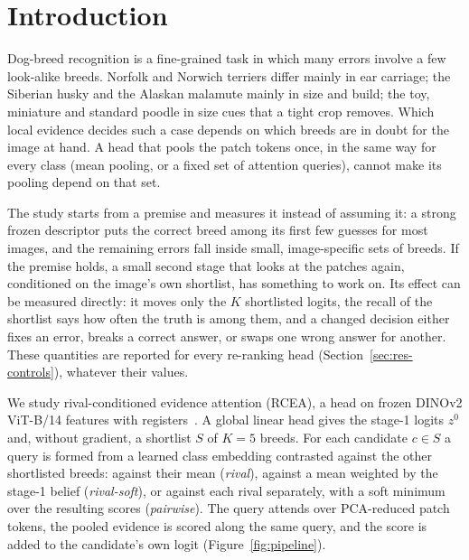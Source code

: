 \documentclass[11pt,a4paper]{article}
\theoremstyle{plain}
\begin{document}
\section{Introduction}\label{sec:intro}

Dog-breed recognition is a fine-grained task in which many errors involve a few look-alike breeds. Norfolk and
Norwich terriers differ mainly in ear carriage; the Siberian husky and the Alaskan malamute mainly in size and
build; the toy, miniature and standard poodle in size cues that a tight crop removes. Which local evidence decides such a
case depends on which breeds are in doubt for the image at hand. A head that pools the patch tokens once, in the
same way for every class (mean pooling, or a fixed set of attention queries), cannot make its pooling depend on
that set.

The study starts from a premise and measures it instead of assuming it: a strong frozen descriptor puts the correct
breed among its first few guesses for most images, and the remaining errors fall inside small, image-specific sets
of breeds. If the premise holds, a small second stage that looks at the patches again, conditioned on the image's
own shortlist, has something to work on. Its effect can be measured directly: it moves only the $K$ shortlisted
logits, the recall of the shortlist says how often the truth is among them, and a changed decision either fixes an
error, breaks a correct answer, or swaps one wrong answer for another. These quantities are reported for every
re-ranking head (Section~\ref{sec:res-controls}), whatever their values.

We study rival-conditioned evidence attention (RCEA), a head on frozen DINOv2 ViT-B/14 features with
registers~\citep{oquab2024dinov2,darcet2024registers}. A global linear head gives the stage-1 logits $z^0$ and,
without gradient, a shortlist $S$ of $K=5$ breeds. For each candidate $c\in S$ a query is formed from a learned class
embedding contrasted against the other shortlisted breeds: against their mean (\emph{rival}), against a mean weighted
by the stage-1 belief (\emph{rival-soft}), or against each rival separately, with a soft minimum over the resulting
scores (\emph{pairwise}). The query attends over PCA-reduced patch tokens, the pooled evidence is scored along the
same query, and the score is added to the candidate's own logit (Figure~\ref{fig:pipeline}).
\end{document}

